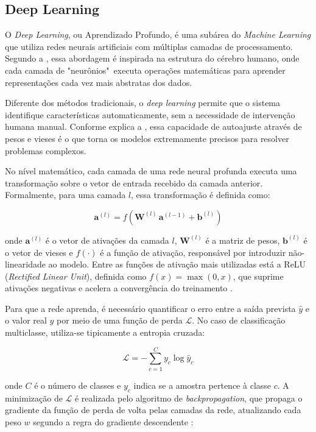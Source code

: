 \documentclass[
    12pt,                %
    openright,           %
    oneside,             %
    a4paper,             %
    english,             %
    brazil               %
]{abntex2}
\begin{document}
\subsection{Deep Learning}

O \textit{Deep Learning}, ou Aprendizado Profundo, é uma subárea do \textit{Machine Learning} que utiliza redes neurais artificiais com múltiplas camadas de processamento. Segundo a , essa abordagem é inspirada na estrutura do cérebro humano, onde cada camada de "neurônios"\ executa operações matemáticas para aprender representações cada vez mais abstratas dos dados.

Diferente dos métodos tradicionais, o \textit{deep learning} permite que o sistema identifique características automaticamente, sem a necessidade de intervenção humana manual. Conforme explica a , essa capacidade de autoajuste através de pesos e vieses é o que torna os modelos extremamente precisos para resolver problemas complexos.

No nível matemático, cada camada de uma rede neural profunda executa uma transformação sobre o vetor de entrada recebido da camada anterior. Formalmente, para uma camada $l$, essa transformação é definida como:

\begin{equation}
    \mathbf{a}^{(l)} = f\!\left(\mathbf{W}^{(l)}\,\mathbf{a}^{(l-1)} + \mathbf{b}^{(l)}\right)
    \label{eq:forward}
\end{equation}

\noindent onde $\mathbf{a}^{(l)}$ é o vetor de ativações da camada $l$, $\mathbf{W}^{(l)}$ é a matriz de pesos, $\mathbf{b}^{(l)}$ é o vetor de vieses e $f(\cdot)$ é a função de ativação, responsável por introduzir não-linearidade ao modelo. Entre as funções de ativação mais utilizadas está a ReLU (\textit{Rectified Linear Unit}), definida como $f(x) = \max(0, x)$, que suprime ativações negativas e acelera a convergência do treinamento \cite{Goodfellow2016}.

Para que a rede aprenda, é necessário quantificar o erro entre a saída prevista $\hat{y}$ e o valor real $y$ por meio de uma função de perda $\mathcal{L}$. No caso de classificação multiclasse, utiliza-se tipicamente a entropia cruzada:

\begin{equation}
    \mathcal{L} = -\sum_{c=1}^{C} y_c \log\hat{y}_c
    \label{eq:loss}
\end{equation}

\noindent onde $C$ é o número de classes e $y_c$ indica se a amostra pertence à classe $c$. A minimização de $\mathcal{L}$ é realizada pelo algoritmo de \textit{backpropagation}, que propaga o gradiente da função de perda de volta pelas camadas da rede, atualizando cada peso $w$ segundo a regra do gradiente descendente \cite{Goodfellow2016}:
\end{document}

